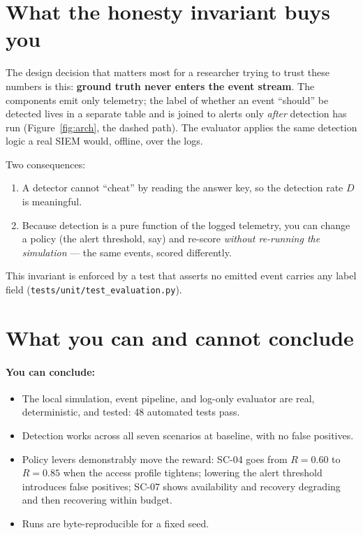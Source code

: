 \documentclass[11pt]{article}
\newcommand{\file}[1]{\textcolor{mfpurple}{\texttt{\small #1}}}
\begin{document}
\section{What the honesty invariant buys you}
\label{sec:honest}

The design decision that matters most for a researcher trying to trust these
numbers is this: \textbf{ground truth never enters the event stream}. The
components emit only telemetry; the label of whether an event ``should'' be
detected lives in a separate table and is joined to alerts only \emph{after}
detection has run (Figure~\ref{fig:arch}, the dashed path). The evaluator applies
the same detection logic a real SIEM would, offline, over the logs.

Two consequences:
\begin{enumerate}[leftmargin=1.4em]
  \item A detector cannot ``cheat'' by reading the answer key, so the detection
        rate $D$ is meaningful.
  \item Because detection is a pure function of the logged telemetry, you can
        change a policy (the alert threshold, say) and re-score \emph{without
        re-running the simulation} --- the same events, scored differently.
\end{enumerate}
This invariant is enforced by a test that asserts no emitted event carries any
label field (\file{tests/unit/test\_evaluation.py}).

\section{What you can and cannot conclude}
\label{sec:limits}

\paragraph{You can conclude:}
\begin{itemize}[leftmargin=1.4em,nosep]
  \item The local simulation, event pipeline, and log-only evaluator are real,
        deterministic, and tested: 48 automated tests pass.
  \item Detection works across all seven scenarios at baseline, with no false
        positives.
  \item Policy levers demonstrably move the reward: SC-04 goes from $R=0.60$ to
        $R=0.85$ when the access profile tightens; lowering the alert threshold
        introduces false positives; SC-07 shows availability and recovery
        degrading and then recovering within budget.
  \item Runs are byte-reproducible for a fixed seed.
\end{itemize}
\end{document}

